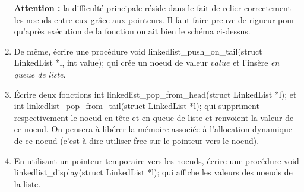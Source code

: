 \documentclass[../../../main.tex]{subfiles}
\begin{document}
\begin{enumerate}
	\textbf{Attention :} la difficulté principale réside dans le fait de relier correctement les noeuds entre eux grâce aux pointeurs. Il faut faire preuve de rigueur pour qu'après exécution de la fonction on ait bien le schéma ci-dessus.
	\item De même, écrire une procédure \textsf{void linkedlist\_push\_on\_tail(struct LinkedList *l, int value);} qui crée un noeud de valeur $value$ et l'insère \textit{en queue de liste}.
	\item Écrire deux fonctions \textsf{int linkedlist\_pop\_from\_head(struct LinkedList *l);} et \textsf{int linkedlist\_pop\_from\_tail(struct LinkedList *l);} qui suppriment respectivement le noeud en tête et en queue de liste et renvoient la valeur de ce noeud. On pensera à libérer la mémoire associée à l'allocation dynamique de ce noeud (c'est-à-dire utiliser \textsf{free} sur le pointeur vers le noeud).
	\item En utilisant un pointeur temporaire vers les noeuds, écrire une procédure \textsf{void linkedlist\_display(struct LinkedList *l);} qui affiche les valeurs des noeuds de la liste.
\end{enumerate}
\end{document}

